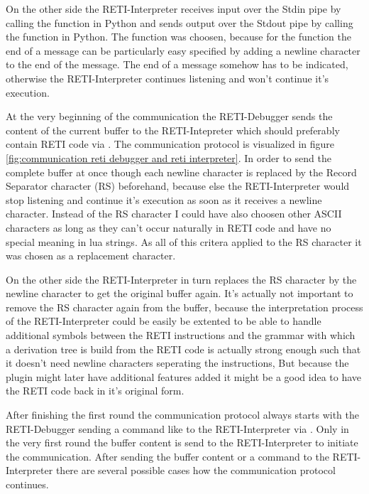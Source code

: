 \documentclass{report}
\begin{document}
On the other side the RETI-Interpreter receives input over the Stdin pipe by calling the  function in Python and sends output over the Stdout pipe by calling the  function in Python. The  function was choosen, because for the  function the end of a message can be particularly easy specified by adding a newline character  to the end of the message. The end of a message somehow has to be indicated, otherwise the RETI-Interpreter continues listening and won't continue it's execution.

At the very beginning of the communication the RETI-Debugger sends the content of the current buffer to the RETI-Intepreter which should preferably contain RETI code via  . The \alert{communication protocol} is visualized in figure \ref{fig:communication reti debugger and reti interpreter}. In order to send the complete buffer at once though each newline character  is replaced by the Record Separator character (\alert{RS})  beforehand, because else the RETI-Interpreter would stop listening and continue it's execution as soon as it receives a newline character. Instead of the RS character I could have also choosen other ASCII characters as long as they can't occur naturally in RETI code and have no special meaning in lua strings. As all of this critera applied to the RS character it was chosen as a replacement character.

On the other side the RETI-Interpreter in turn replaces the RS character  by the newline character  to get the original buffer again. It's actually not important to remove the RS character again from the buffer, because the interpretation process of the RETI-Interpreter could be easily be extented to be able to handle additional symbols between the RETI instructions and the grammar with which a derivation tree is build from the RETI code is actually strong enough such that it doesn't need newline characters  seperating the instructions, But because the plugin might later have additional features added it might be a good idea to have the RETI code back in it's original form.

After finishing the first round the communication protocol always starts with the RETI-Debugger sending a command like  to the RETI-Interpreter via . Only in the very first round the buffer content is send to the RETI-Interpreter to initiate the communication. After sending the buffer content or a command to the RETI-Interpreter there are several possible cases how the communication protocol continues.
\end{document}
